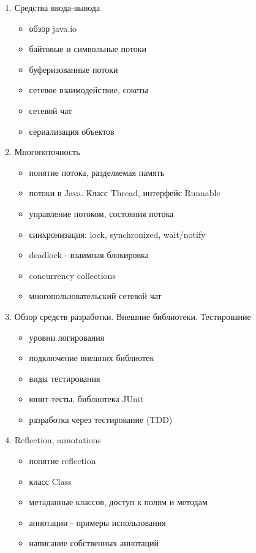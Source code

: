\documentclass[a4paper,12pt]{article}
\begin{document}
\begin{enumerate}
\item Средства ввода-вывода
    \begin{itemize}
        \item обзор java.io
        \item байтовые и символьные потоки
        \item буферизованные потоки
        \item сетевое взаимодействие, сокеты
        \item сетевой чат
        \item сериализация объектов
    \end{itemize}

\item Многопоточность
    \begin{itemize}
        \item понятие потока, разделяемая память
        \item потоки в Java. Класс Thread, интерфейс Runnable
        \item управление потоком, состояния потока
        \item синхронизация: lock, synchronized, wait/notify
        \item deadlock - взаимная блокировка
        \item concurrency collections
        \item многопользовательский сетевой чат
    \end{itemize}
    
\item Обзор средств разработки. Внешние библиотеки. Тестирование
    \begin{itemize}
        \item уровни логирования
        \item подключение внешних библиотек
        \item виды тестирования
        \item юнит-тесты, библиотека JUnit
        \item разработка через тестирование (TDD)
    \end{itemize}

\item Reflection, annotations
    \begin{itemize}
        \item понятие reflection
        \item класс Class
        \item метаданные классов, доступ к полям и методам
        \item аннотации - примеры использования
        \item написание собственных аннотаций
    \end{itemize}
    
\end{enumerate}
\end{document}
